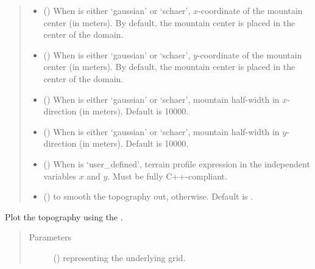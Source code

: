 \documentclass[letterpaper,10pt,english]{sphinxmanual}
\begin{document}
\begin{fulllineitems}
\begin{fulllineitems}
\begin{quote}
\begin{description}
\begin{itemize}
\item {} 
 () \textendash{} When  is either ‘gaussian’ or ‘schaer’, \(x\)-coordinate of the mountain center
(in meters). By default, the mountain center is placed in the center of the domain.

\item {} 
 () \textendash{} When  is either ‘gaussian’ or ‘schaer’, \(y\)-coordinate of the mountain center
(in meters). By default, the mountain center is placed in the center of the domain.

\item {} 
 () \textendash{} When  is either ‘gaussian’ or ‘schaer’, mountain half-width in \(x\)-direction
(in meters). Default is 10000.

\item {} 
 () \textendash{} When  is either ‘gaussian’ or ‘schaer’, mountain half-width in \(y\)-direction
(in meters). Default is 10000.

\item {} 
 () \textendash{} When  is ‘user\_defined’, terrain profile expression in the independent variables
\(x\) and \(y\). Must be fully C++-compliant.

\item {} 
 () \textendash{}  to smooth the topography out,  otherwise. Default is .

\end{itemize}

\end{description}\end{quote}

\end{fulllineitems}


\begin{fulllineitems}
\label{\detokenize{api:tasmania.grids.topography.Topography2d.plot}}
Plot the topography using the .
\begin{quote}\begin{description}
\item[{Parameters}] \leavevmode
{} () \textendash{} {\hyperref[\detokenize{api:tasmania.grids.grid_xy.GridXY}]{}} representing the underlying grid.


\end{description}
\end{quote}
\end{fulllineitems}
\end{fulllineitems}
\end{document}
